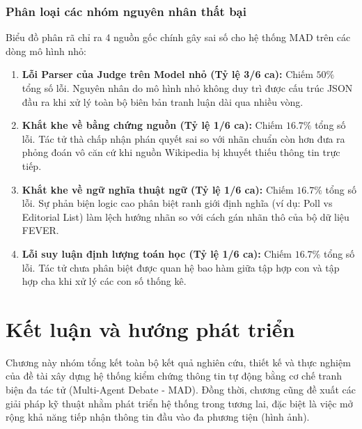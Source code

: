 \documentclass[12pt,a4paper]{report}
\begin{document}
\subsection{Phân loại các nhóm nguyên nhân thất bại}
Biểu đồ phân rã chỉ ra 4 nguồn gốc chính gây sai số cho hệ thống MAD trên các dòng mô hình nhỏ:
\begin{enumerate}
    \item \textbf{Lỗi Parser của Judge trên Model nhỏ (Tỷ lệ 3/6 ca):} Chiếm $50\%$ tổng số lỗi. Nguyên nhân do mô hình nhỏ không duy trì được cấu trúc JSON đầu ra khi xử lý toàn bộ biên bản tranh luận dài qua nhiều vòng.
    \item \textbf{Khắt khe về bằng chứng nguồn (Tỷ lệ 1/6 ca):} Chiếm $16.7\%$ tổng số lỗi. Tác tử thà chấp nhận phán quyết sai so với nhãn chuẩn còn hơn đưa ra phỏng đoán vô căn cứ khi nguồn Wikipedia bị khuyết thiếu thông tin trực tiếp.
    \item \textbf{Khắt khe về ngữ nghĩa thuật ngữ (Tỷ lệ 1/6 ca):} Chiếm $16.7\%$ tổng số lỗi. Sự phản biện logic cao phân biệt ranh giới định nghĩa (ví dụ: Poll vs Editorial List) làm lệch hướng nhãn so với cách gán nhãn thô của bộ dữ liệu FEVER.
    \item \textbf{Lỗi suy luận định lượng toán học (Tỷ lệ 1/6 ca):} Chiếm $16.7\%$ tổng số lỗi. Tác tử chưa phân biệt được quan hệ bao hàm giữa tập hợp con và tập hợp cha khi xử lý các con số thống kê.
\end{enumerate}

\chapter{Kết luận và hướng phát triển}
\label{ch:ket_luan_huong_phat_trien}

Chương này nhóm tổng kết toàn bộ kết quả nghiên cứu, thiết kế và thực nghiệm của đề tài xây dựng hệ thống kiểm chứng thông tin tự động bằng cơ chế tranh biện đa tác tử (Multi-Agent Debate - MAD). Đồng thời, chương cũng đề xuất các giải pháp kỹ thuật nhằm phát triển hệ thống trong tương lai, đặc biệt là việc mở rộng khả năng tiếp nhận thông tin đầu vào đa phương tiện (hình ảnh).

\end{document}
